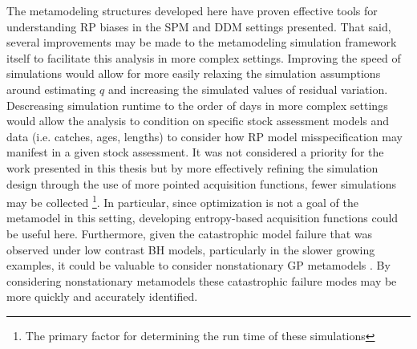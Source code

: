 \documentclass[12pt]{ucscthesis}
\begin{document}
%
The metamodeling structures developed here have proven effective tools for understanding RP biases 
in the SPM and DDM settings presented. That said, several improvements may be made to the metamodeling 
simulation framework itself to facilitate this analysis in more complex settings. Improving the speed 
of simulations would allow for more easily relaxing the simulation assumptions around estimating $q$ and 
increasing the simulated values of residual variation.
Descreasing simulation runtime to the order of days in more complex settings would allow the analysis to
condition on specific stock assessment models and data (i.e. catches, ages, lengths) to consider how RP model 
misspecification may manifest in a given stock assessment. It was not considered a priority 
for the work presented in this thesis but by more effectively refining the simulation design through the 
use of more pointed acquisition functions\cite{pourmohamad_bayesian_2021}, fewer simulations may be collected 
\footnote{The primary factor for determining the run time of these simulations}. In particular, since 
optimization is not a goal of the metamodel in this setting, developing entropy-based acquisition functions 
\cite{hennig_entropy_2012, hernandez-lobato_predictive_2014} could be useful here. Furthermore, given the 
catastrophic model failure that was observed under low contrast BH models, particularly in the slower 
growing examples, it could be valuable to consider nonstationary GP metamodels \cite{gramacy_bayesian_2008, binois_hetgp_2021}. %
By considering nonstationary metamodels these catastrophic failure modes 
may be more quickly and accurately identified.


\end{document}
